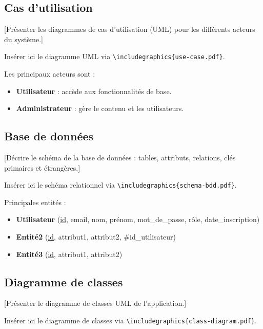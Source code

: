 \documentclass[12pt, a4paper]{article}
\begin{document}
\subsection{Cas d'utilisation}

[Présenter les diagrammes de cas d'utilisation (UML) pour les différents acteurs
du système.]

\begin{remarque}
  Insérer ici le diagramme UML via
  \texttt{\textbackslash includegraphics\{use-case.pdf\}}.
\end{remarque}

Les principaux acteurs sont :
\begin{itemize}
  \item \textbf{Utilisateur} : accède aux fonctionnalités de base.
  \item \textbf{Administrateur} : gère le contenu et les utilisateurs.
\end{itemize}

\subsection{Base de données}

[Décrire le schéma de la base de données : tables, attributs, relations,
clés primaires et étrangères.]

\begin{remarque}
  Insérer ici le schéma relationnel via
  \texttt{\textbackslash includegraphics\{schema-bdd.pdf\}}.
\end{remarque}

\noindent Principales entités :
\begin{itemize}
  \item \textbf{Utilisateur} (\underline{id}, email, nom, prénom, mot\_de\_passe, rôle,
    date\_inscription)
  \item \textbf{Entité2} (\underline{id}, attribut1, attribut2, \#id\_utilisateur)
  \item \textbf{Entité3} (\underline{id}, attribut1, attribut2)
\end{itemize}

\subsection{Diagramme de classes}

[Présenter le diagramme de classes UML de l'application.]

\begin{remarque}
  Insérer ici le diagramme de classes via
  \texttt{\textbackslash includegraphics\{class-diagram.pdf\}}.
\end{remarque}
\end{document}
